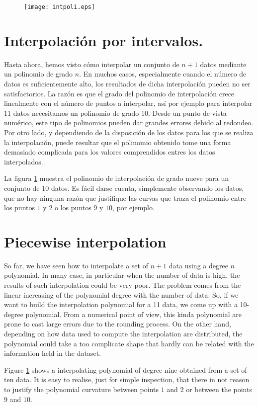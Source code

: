 \begin{figure}[h]
\centering
\texttt{[image: intpoli.eps]}
\label{fig:intepol}
\end{figure}
\begin{paracol}{2}
\section{Interpolación por intervalos.}
Hasta ahora, hemos visto cómo interpolar un conjunto de $n+1$ datos mediante un polinomio de grado $n$. En muchos casos, especialmente cuando el número de datos es suficientemente alto, los resultados de dicha interpolación pueden no ser satisfactorios.  La razón es que el grado del polinomio de interpolación crece linealmente con el número de puntos a interpolar, así por ejemplo para interpolar 11 datos necesitamos un polinomio de grado 10. Desde un punto de vista numérico, este tipo de polinomios pueden dar grandes errores debido al redondeo. Por otro lado, y dependiendo de la disposición de los datos para los que se realiza la interpolación, puede resultar que el polinomio obtenido tome una forma demasiado complicada para los valores comprendidos entres los datos interpolados..  

La figura \ref{fig:intepol} muestra el polinomio de interpolación de grado nueve para un conjunto de 10 datos. Es fácil darse cuenta, simplemente observando los datos, que no hay ninguna razón que justifique las curvas que traza el polinomio entre los puntos $1$ y $2$  o los puntos $9$ y $10$, por ejemplo.

\switchcolumn
\section{Piecewise interpolation}
So far, we have seen how to interpolate a set of $n+1$ data using a degree $n$ polynomial. In many case, in particular when the number of data is high, the results of such interpolation could be very poor. The problem comes from the linear increasing of the polynomial degree with the number of data. So, if we want to build the interpolation polynomial for a 11 data, we come up with a 10-degree polynomial. From a numerical point of view, this kinda polynomial are prone to cast large errors due to the rounding process. On the other hand, depending on how data used to compute the interpolation are distributed, the polynomial could take a too complicate shape that hardly can be related with the information held in the dataset.

Figure \ref{fig:intepol} shows a interpolating polynomial of degree nine obtained from a set of ten data. It is easy to realise, just for simple inspection, that there in not reason to justify the polynomial curvature between points $1$ and $2$ or between the points $9$ and $10$.     
\end{paracol}
